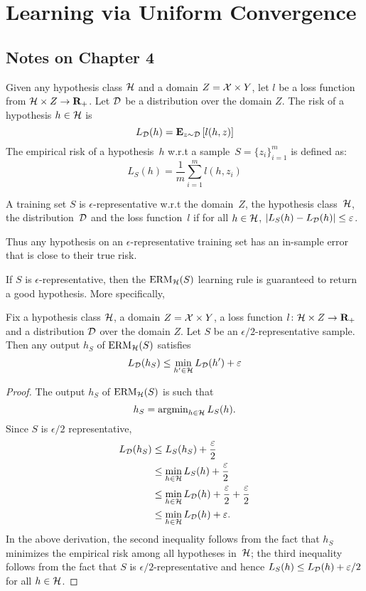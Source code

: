\chapter{Learning via Uniform Convergence}

\section*{Notes on Chapter 4}

Given any hypothesis class $\mathcal{H}$ and a domain $Z = \mathcal{X} \times Y$, let
$l$ be a loss function from $\mathcal{H} \times Z \rightarrow \mathbf{R}_{+}$. Let
$\mathcal{D}$ be a distribution over the domain $Z$. The risk of a hypothesis $h \in
\mathcal{H}$ is
\[
    L_{\mathcal{D}}(h) = \mathbf{E}_{z \sim \mathcal{D}} \left [ l(h, z) \right ]
\]
The empirical risk of a hypothesis~$h$ w.r.t a sample~$S = \{ z_i \}_{i = 1}^{m}$
is defined as:
\[
    L_{S} (h) = \frac{1}{m} \sum_{i = 1}^m l(h, z_i)
\]

\begin{definition}
A training set $S$ is $\epsilon$-representative w.r.t the domain~$Z$,
the hypothesis class~$\mathcal{H}$, the distribution~$\mathcal{D}$ and
the loss function~$l$ if for all $h \in \mathcal{H}$,
$|L_S (h) - L_{\mathcal{D}} (h)| \leq \varepsilon$.
\end{definition}
Thus any hypothesis on an $\epsilon$-representative training set has an
in-sample error that is close to their true risk.

If $S$ is $\epsilon$-representative, then the $\operatorname{ERM}_{\mathcal{H}}(S)$ learning
rule is guaranteed to return a good hypothesis. More specifically,
\begin{lemma}
\label{lemma:epsilon_representative}
Fix a hypothesis class $\mathcal{H}$, a domain $Z = \mathcal{X} \times Y$, a loss
function $l \colon \mathcal{H} \times Z \rightarrow \mathbf{R}_{+}$ and a distribution
$\mathcal{D}$ over the domain $Z$. Let $S$ be an $\epsilon/2$-representative sample.
Then any output $h_S$ of $\operatorname{ERM}_{\mathcal{H}}(S)$ satisfies
\[
    L_{\mathcal{D}} (h_S) \leq \min_{h' \in \mathcal{H}} L_{\mathcal{D}}(h') + \varepsilon
\]
\end{lemma}
\begin{proof}
The output $h_S$ of $\operatorname{ERM}_{\mathcal{H}}(S)$ is such that
\[
    h_S = \operatorname{argmin}_{h \in \mathcal{H}} L_S(h).
\]
Since $S$ is $\epsilon / 2$ representative,
\begin{align*}
    L_{\mathcal{D}}(h_S) & \leq L_S (h_S) + \frac{\varepsilon}{2} \\
                   & \leq \min_{h \in \mathcal{H}} L_S (h) + \frac{\varepsilon}{2} \\
                   & \leq \min_{h \in \mathcal{H}} L_{\mathcal{D}} (h) + \frac{\varepsilon}{2} + \frac{\varepsilon}{2} \\
                   & \leq \min_{h \in \mathcal{H}} L_{\mathcal{D}} (h) + \varepsilon.
\end{align*}
In the above derivation, the second inequality follows from the fact that $h_S$ minimizes
the empirical risk among all hypotheses in~$\mathcal{H}$; the third inequality follows
from the fact that $S$ is $\epsilon / 2$-representative and hence
$L_S(h) \leq L_{\mathcal{D}} (h) + \varepsilon / 2$ for all $h \in \mathcal{H}$.
\end{proof}

